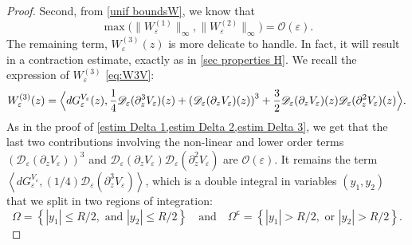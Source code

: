 \documentclass[JEP,XML,SOM,Unicode]{cedram}
\let\mathcal\mathscr
\newcommand{\cO}{\mathcal{O}}
\theoremstyle{plain}
\theoremstyle{definition}
\newcommand{\comega}{\Omega^{\mathsf{c}}}
\newcommand{\D}{\mathcal{D}_\eps}
\let\eps\varepsilon
\newcommand{\abs}[1]{\left\lvert#1\right\rvert}
\newcommand{\dQVe}{dG_\eps^{V_\eps}}
\begin{document}
\begin{proof}
Second, from \cref{unif boundsW}, we know that
\begin{equation*}
\max\bigl (\bigl \| W_\eps^{(1)} \bigr \|_{\infty}, \bigl \| W_\eps^{(2)} \bigr \|_{\infty} \bigr)= \cO(\eps).
\end{equation*}
The remaining term, $W_\eps^{(3)}(z)$ is more delicate to handle. In fact, it will result in a contraction estimate, exactly as in \cref{sec properties H}. We recall the expression of $W_\eps^{(3)} $ \eqref{eq:W3V}:
\begin{equation*}
W_\eps^{(3)}(z) =
\Bigl\langle \dQVe(z), \dfrac{1}{4} \D(\partial_z^3 V_\eps)(z) + \left(\D(\partial_z V_\eps)(z)\right)^3
+ \frac32 \D(\partial_z V_\eps)(z) \D(\partial_z^2 V_\eps)(z) \Bigr\rangle.
\end{equation*}
As in the proof of \cref{estim Delta 1,estim Delta 2,estim Delta 3}, we get that the last two contributions involving the non-linear and lower order terms $\left(\D(\partial_z V_\eps) \right)^3$ and
$ \D(\partial_z V_\eps) \D(\partial_z^2 V_\eps)$ are $\cO(\eps)$.
It remains the term $\left\langle \dQVe, (1/4) \D(\partial_z^3 V_\eps) \right \rangle$, which is a double integral in variables $(y_1,y_2)$ that we split in two regions of integration: $$\Omega = \left\{ \abs{y_1} \leq R/2, \text{ and } \abs{y_2} \leq R/2 \right\}\quad\text{and}\quad \comega= \left\{ \abs{y_1} > R/2, \text{ or } \abs{y_2} > R/2 \right\}.$$


\end{proof}
\end{document}
